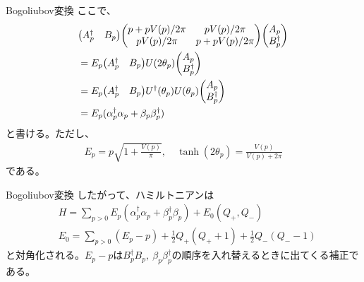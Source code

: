 \documentclass[\main/TL_liquid.tex]{subfiles}
\begin{document}
\begin{frame}{Bogoliubov変換}
    ここで、
    \begin{align}
        & \nonumber
        \mqty(A_p^\dagger & B_p)
        \mqty(
            p + pV(p)/2\pi & pV(p)/2\pi
            \\
            pV(p)/2\pi & p + pV(p)/2\pi
        )
        \mqty(A_p \\ B_p^\dagger)
        \\ & \nonumber
        = E_p\mqty(A_p^\dagger & B_p)U(2\theta_p)
            \mqty(A_p \\ B_p^\dagger) 
        \\ & \nonumber
        = E_p\mqty(A_p^\dagger & B_p)U^\dagger(\theta_p) U(\theta_p)
        \mqty(A_p \\ B_p^\dagger) 
        \\ &
        = E_p(\alpha_p^\dagger \alpha_p + \beta_p \beta_p^\dagger)
    \end{align}
    と書ける。ただし、
    \begin{align}
        E_p = p\sqrt{1 + \frac{V(p)}{\pi}},
        \quad
        \tanh(2\theta_p) = \frac{V(p)}{V(p)+2\pi}
    \end{align}
    である。
\end{frame}

\begin{frame}{Bogoliubov変換}
    したがって、ハミルトニアンは
    \begin{align}
        &
        H = \sum_{p>0} E_p(\alpha_p^\dagger \alpha_p + \beta_p^\dagger \beta_p) + E_0(Q_+, Q_-)
        \\ &
        E_0
        = \sum_{p>0}(E_p - p)
            + \frac{1}{2}Q_+(Q_++1)
            + \frac{1}{2}Q_-(Q_--1)
    \end{align}
    と対角化される。$E_p - p$は$B_p^\dagger B_p,~ \beta_p \beta_p^\dagger$の順序を入れ替えるときに出てくる補正である。
\end{frame}
    
\end{document}
